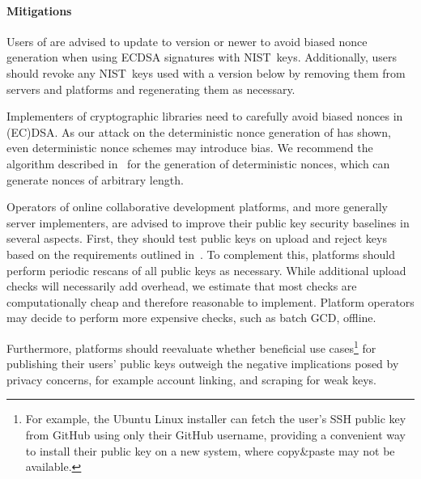 \paragraph{Mitigations}

Users of \putty are advised to update to version \puttyfixedversion or newer to avoid biased nonce generation when using ECDSA signatures with NIST~\pfivetwoone keys. Additionally, users should revoke any NIST~\pfivetwoone keys used with a \putty version below \puttyfixedversion by removing them from servers and platforms and regenerating them as necessary.

Implementers of cryptographic libraries need to carefully avoid biased nonces in (EC)DSA. As our attack on the deterministic nonce generation of \putty has shown, even deterministic nonce schemes may introduce bias. We recommend the algorithm described in~\cite{rfc6979} for the generation of deterministic nonces, which can generate nonces of arbitrary length.

Operators of online collaborative development platforms, and more generally server implementers, are advised to improve their public key security baselines in several aspects. First, they should test public keys on upload and reject keys based on the requirements outlined in~\cite{ca-browser-forum-2.1.2}. To complement this, platforms should perform periodic rescans of all public keys as necessary. While additional upload checks will necessarily add overhead, we estimate that most checks are computationally cheap and therefore reasonable to implement. Platform operators may decide to perform more expensive checks, such as batch GCD, offline.

Furthermore, platforms should reevaluate whether beneficial use cases\footnote{For example, the Ubuntu Linux installer can fetch the user's SSH public key from GitHub using only their GitHub username, providing a convenient way to install their public key on a new system, where copy\&paste may not be available.} for publishing their users' public keys outweigh the negative implications posed by privacy concerns, for example account linking, and scraping for weak keys.

